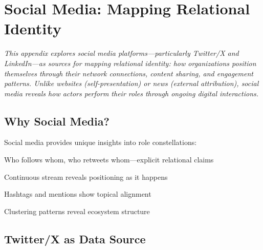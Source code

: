 \chapter{Social Media: Mapping Relational Identity}
\label{app:social-media}

\noindent\textit{This appendix explores social media platforms---particularly Twitter/X and LinkedIn---as sources for mapping relational identity: how organizations position themselves through their network connections, content sharing, and engagement patterns. Unlike websites (self-presentation) or news (external attribution), social media reveals how actors perform their roles through ongoing digital interactions.}

\bigskip


\section*{Why Social Media?}

Social media provides unique insights into role constellations:


\begin{description}[leftmargin=0.5cm, itemsep=0.3em]
\item[Network Visibility] Who follows whom, who retweets whom---explicit relational claims
\item[Real-time Dynamics] Continuous stream reveals positioning as it happens
\item[Discourse Participation] Hashtags and mentions show topical alignment
\item[Community Boundaries] Clustering patterns reveal ecosystem structure
\end{description}


\section*{Twitter/X as Data Source}


